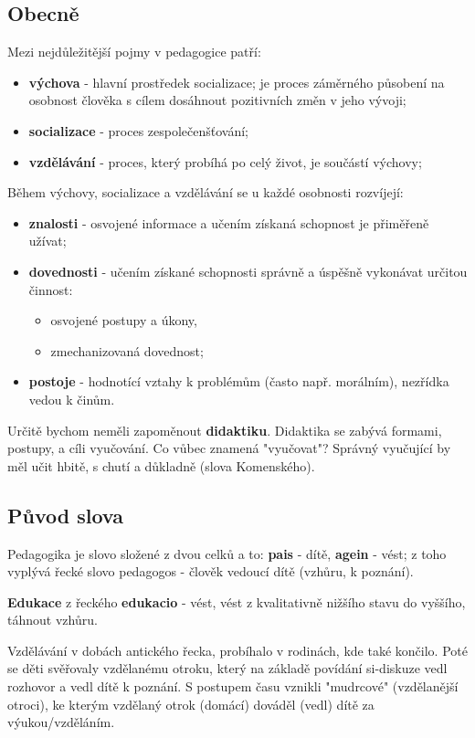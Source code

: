 \documentclass[a4paper,12pt,final]{report}
\begin{document}
\subsection*{Obecně}
Mezi nejdůležitější pojmy v pedagogice patří:
\begin{itemize} 
 \item \textbf{výchova} - hlavní prostředek socializace; je proces záměrného působení na osobnost člověka s cílem dosáhnout pozitivních změn v jeho vývoji;
 \item \textbf{socializace} - proces zespolečenšťování;
 \item \textbf{vzdělávání} - proces, který probíhá po celý život, je součástí výchovy;
\end{itemize}

Během výchovy, socializace a vzdělávání se u každé osobnosti rozvíjejí:
\begin{itemize} 
 \item \textbf{znalosti} - osvojené informace a učením získaná schopnost je přiměřeně užívat;
 \item \textbf{dovednosti} - učením získané schopnosti správně a úspěšně vykonávat určitou činnost:
 \begin{itemize}
  \item osvojené postupy a úkony,
  \item zmechanizovaná dovednost;
 \end{itemize}
 \item \textbf{postoje} - hodnotící vztahy k problémům (často např. morálním), nezřídka vedou k činům.
\end{itemize}

Určitě bychom neměli zapoměnout \textbf{didaktiku}. Didaktika se zabývá formami, postupy, a cíli vyučování. Co vůbec znamená "vyučovat"? Správný vyučující by měl učit hbitě, s chutí a důkladně (slova Komenského). 

\subsection*{Původ slova}
Pedagogika je slovo složené z dvou celků a to: \textbf{pais} - dítě, \textbf{agein} - vést; z toho vyplývá řecké slovo pedagogos - člověk vedoucí dítě (vzhůru, k poznání).

\textbf{Edukace} z řeckého \textbf{edukacio} - vést, vést z kvalitativně nižšího stavu do vyššího, táhnout vzhůru.

Vzdělávání v dobách antického řecka, probíhalo v rodinách, kde také končilo. Poté se děti svěřovaly vzdělanému otroku, který na základě povídání si-diskuze vedl rozhovor a vedl dítě k poznání. S postupem času vznikli "mudrcové" (vzdělanější otroci), ke kterým vzdělaný otrok (domácí) dováděl (vedl) dítě za výukou/vzděláním.
\end{document}
